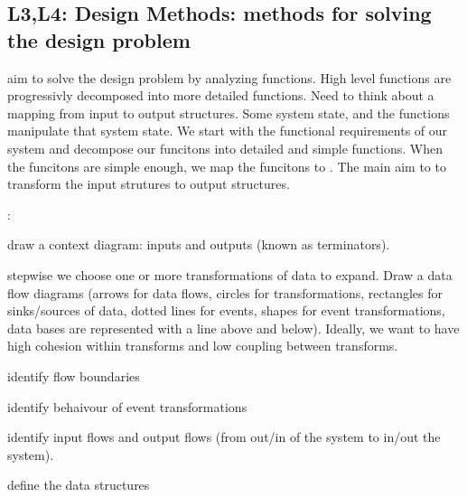 \subsection{L3,L4: Design Methods: methods for solving the design problem}

\begin{compactitem} 
\item {} aim to solve the design
problem by analyzing functions. High level functions are progressivly decomposed into more detailed functions. Need to think about a mapping from input to output structures. Some system state, and the functions manipulate that system state. We start with the functional requirements of our system and decompose our funcitons into detailed and simple functions. When the funcitons are simple enough, we map the funcitons to  . The main aim to to transform the input strutures to output structures. 

\item {}:
\begin{compactitem}
\item draw a context diagram: inputs and outputs (known as terminators).
\item stepwise we choose one or more transformations of data to expand. Draw a data flow diagrams (arrows for data flows, circles for transformations, rectangles for sinks/sources of data, dotted lines for events, shapes for event transformations, data bases are represented with a line above and below). Ideally, we want to have high cohesion within transforms and low coupling between transforms. 
\item identify flow boundaries
\item identify behaivour of event transformations 
\item identify input flows and output flows (from out/in of the system to in/out the system).
\item define the data structures
\end{compactitem}


\end{compactitem}
